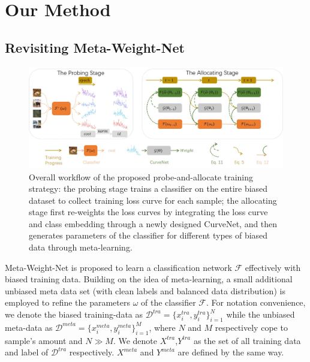 \documentclass[letterpaper]{article} %
\begin{document}


\section{Our Method}
\subsection{Revisiting Meta-Weight-Net}
\label{sec:revisit}

\begin{figure}[t]
\begin{center}
   \includegraphics[width=0.85\linewidth]{figs/framework.jpg}
\end{center}
\vspace{-0.30cm} 
   \caption{Overall workflow of the proposed probe-and-allocate training strategy: the probing stage trains a classifier on the entire biased dataset to collect training loss curve for each sample; the allocating stage first re-weights the loss curves by integrating the loss curve and class embedding through a newly designed CurveNet, and then generates parameters of the classifier for different types of biased data through meta-learning.
   }
\label{fig:framework}
\vspace{-0.50cm} 
\end{figure}

Meta-Weight-Net is proposed to learn a classification network $\mathcal{F}$ effectively with biased training data. 
Building on the idea of meta-learning, a small additional unbiased meta data set (with clean labels and balanced data distribution) is employed to refine the parameters $\omega$ of the classifier $\mathcal{F}$.
For notation convenience, we denote the biased training-data as $\mathcal{D}^{tra}=\{x^{tra}_i,y^{tra}_i\}_{i=1}^N$ while the unbiased meta-data as $\mathcal{D}^{meta}=\{x^{meta}_i,y^{meta}_i\}_{i=1}^M$,  where $N$ and $M$ respectively cope to sample's amount and $N \gg M$.
We denote $X^{tra}$,$Y^{tra}$ as the set of all training data and label of $\mathcal{D}^{tra}$ respectively.
$X^{meta}$ and $Y^{meta}$ are defined by the same way.
\end{document}
